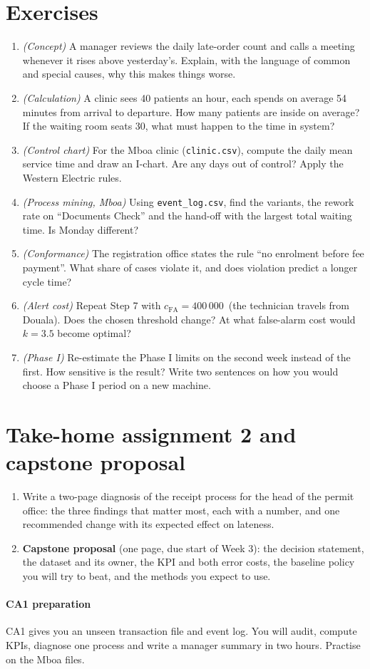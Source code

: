 \section{Exercises}
\begin{enumerate}[label=\textbf{2.\arabic*},leftmargin=2.4em]
\item \emph{(Concept)} A manager reviews the daily late-order count and calls a meeting whenever it rises above
yesterday's. Explain, with the language of common and special causes, why this makes things worse.
\item \emph{(Calculation)} A clinic sees 40 patients an hour, each spends on average 54 minutes from arrival to
departure. How many patients are inside on average? If the waiting room seats 30, what must happen to the time in
system?
\item \emph{(Control chart)} For the Mboa clinic (\texttt{clinic.csv}), compute the daily mean service time and draw an
I-chart. Are any days out of control? Apply the Western Electric rules.
\item \emph{(Process mining, Mboa)} Using \texttt{event\_log.csv}, find the variants, the rework rate on ``Documents
Check'' and the hand-off with the largest total waiting time. Is Monday different?
\item \emph{(Conformance)} The registration office states the rule ``no enrolment before fee payment''. What share of
cases violate it, and does violation predict a longer cycle time?
\item \emph{(Alert cost)} Repeat Step 7 with $c_{\text{FA}}=400\,000$\xaf\ (the technician travels from Douala). Does the
chosen threshold change? At what false-alarm cost would $k=3.5$ become optimal?
\item \emph{(Phase I)} Re-estimate the Phase I limits on the second week instead of the first. How sensitive is the
result? Write two sentences on how you would choose a Phase I period on a new machine.
\end{enumerate}

\section{Take-home assignment 2 and capstone proposal}
\begin{enumerate}[nosep]
\item Write a two-page diagnosis of the receipt process for the head of the permit office: the three findings that
matter most, each with a number, and one recommended change with its expected effect on lateness.
\item \textbf{Capstone proposal} (one page, due start of Week 3): the decision statement, the dataset and its owner,
the KPI and both error costs, the baseline policy you will try to beat, and the methods you expect to use.
\end{enumerate}
\paragraph{CA1 preparation} CA1 gives you an unseen transaction file and event log. You will audit, compute KPIs,
diagnose one process and write a manager summary in two hours. Practise on the Mboa files.
